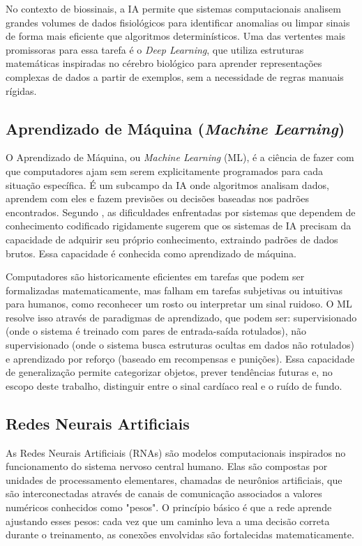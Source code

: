 \documentclass[tcc,capa]{texufpel}
\begin{document}
No contexto de biossinais, a IA permite que sistemas computacionais analisem grandes volumes de dados fisiológicos para identificar anomalias ou limpar sinais de forma mais eficiente que algoritmos determinísticos. Uma das vertentes mais promissoras para essa tarefa é o \textit{Deep Learning}, que utiliza estruturas matemáticas inspiradas no cérebro biológico para aprender representações complexas de dados a partir de exemplos, sem a necessidade de regras manuais rígidas.

\subsection{Aprendizado de Máquina (\textit{Machine Learning})}

O Aprendizado de Máquina, ou \textit{Machine Learning} (ML), é a ciência de fazer com que computadores ajam sem serem explicitamente programados para cada situação específica. É um subcampo da IA onde algoritmos analisam dados, aprendem com eles e fazem previsões ou decisões baseadas nos padrões encontrados. Segundo \citet{goodfellow2016}, as dificuldades enfrentadas por sistemas que dependem de conhecimento codificado rigidamente sugerem que os sistemas de IA precisam da capacidade de adquirir seu próprio conhecimento, extraindo padrões de dados brutos. Essa capacidade é conhecida como aprendizado de máquina.

Computadores são historicamente eficientes em tarefas que podem ser formalizadas matematicamente, mas falham em tarefas subjetivas ou intuitivas para humanos, como reconhecer um rosto ou interpretar um sinal ruidoso. O ML resolve isso através de paradigmas de aprendizado, que podem ser: supervisionado (onde o sistema é treinado com pares de entrada-saída rotulados), não supervisionado (onde o sistema busca estruturas ocultas em dados não rotulados) e aprendizado por reforço (baseado em recompensas e punições). Essa capacidade de generalização permite categorizar objetos, prever tendências futuras e, no escopo deste trabalho, distinguir entre o sinal cardíaco real e o ruído de fundo.

\subsection{Redes Neurais Artificiais}

As Redes Neurais Artificiais (RNAs) são modelos computacionais inspirados no funcionamento do sistema nervoso central humano. Elas são compostas por unidades de processamento elementares, chamadas de neurônios artificiais, que são interconectadas através de canais de comunicação associados a valores numéricos conhecidos como "pesos". O princípio básico é que a rede aprende ajustando esses pesos: cada vez que um caminho leva a uma decisão correta durante o treinamento, as conexões envolvidas são fortalecidas matematicamente.
\end{document}
